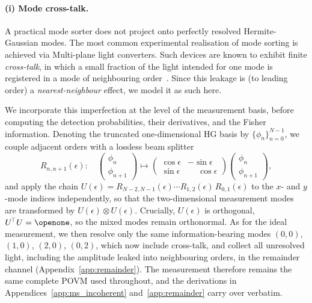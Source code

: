 \documentclass[reprint,amsmath,amssymb,aps,prl,floatfix,groupedaddress,superscriptaddress]{revtex4-2}
\begin{document}
\paragraph{{\color{red}(i) Mode cross-talk.}}
{\color{red}
A practical mode sorter does not project onto perfectly resolved Hermite-Gaussian modes. The most common experimental realisation of mode sorting is achieved via Multi-plane light converters. Such devices are known to exhibit finite {\em cross-talk}, in which a small fraction of the light intended for one mode is registered in a mode of neighbouring order~\cite{gessner2020spadeerror,modes,MPLC}. Since this leakage is (to leading order) a {\em nearest-neighbour} effect, we model it as such here.

We incorporate this imperfection at the level of the measurement basis, before computing the detection probabilities, their derivatives, and the Fisher information. Denoting the truncated one-dimensional HG basis by $\{\phi_n\}_{n=0}^{N-1}$, we couple adjacent orders with a lossless beam splitter
\begin{equation}
R_{n,n+1}(\epsilon):\quad
\begin{pmatrix}\phi_n\\ \phi_{n+1}\end{pmatrix}
\longmapsto
\begin{pmatrix}\cos\epsilon & -\sin\epsilon\\ \sin\epsilon & \phantom{-}\cos\epsilon\end{pmatrix}
\begin{pmatrix}\phi_n\\ \phi_{n+1}\end{pmatrix},
\end{equation}
and apply the chain $U(\epsilon)=R_{N-2,N-1}(\epsilon)\cdots R_{1,2}(\epsilon)\,R_{0,1}(\epsilon)$ to the $x$- and $y$-mode indices independently, so that the two-dimensional measurement modes are transformed by $U(\epsilon)\otimes U(\epsilon)$. Crucially, $U(\epsilon)$ is orthogonal, $U^{\!\top} U=\openone$, so the mixed modes remain orthonormal. As for the ideal measurement, we then resolve only the same information-bearing modes $(0,0)$, $(1,0)$, $(2,0)$, $(0,2)$, which now include cross-talk, and collect all unresolved light, including the amplitude leaked into neighbouring orders, in the remainder channel (Appendix~\ref{app:remainder}). The measurement therefore remains the same complete POVM used throughout, and the derivations in Appendices~\ref{app:ms_incoherent} and~\ref{app:remainder} carry over verbatim.

}
\end{document}
